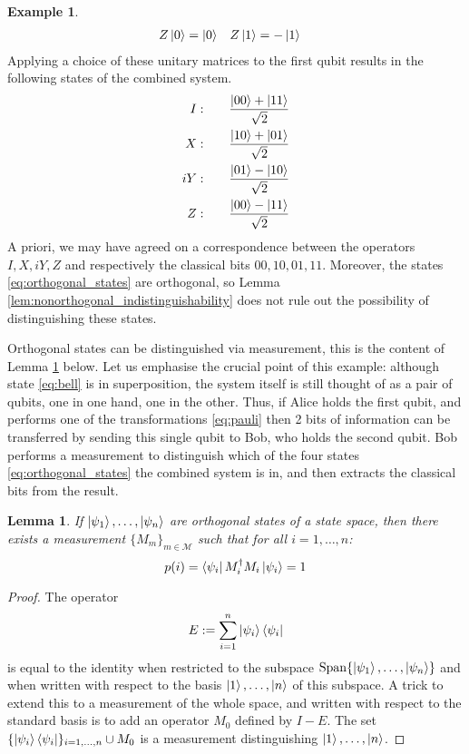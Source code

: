 \documentclass[12pt]{article}
\theoremstyle{plain}
\newtheorem{lemma}[thm]{Lemma}
\theoremstyle{definition}
\newtheorem{example}[thm]{Example}
\newcommand{\call}[1]{\mathcal{#1}}
\begin{document}
\begin{example}
\begin{align*}
			Z\ket{0} &= \ket{0} & Z\ket{1} &=-\ket{1}
		\end{align*}
		Applying a choice of these unitary matrices to the first qubit results in the following states of the combined system.
		\begin{align}\label{eq:orthogonal_states}
			\begin{split}
			I:\qquad & \frac{\ket{00} + \ket{11}}{\sqrt{2}}\\
			X:\qquad & \frac{\ket{10} + \ket{01}}{\sqrt{2}}\\
			iY:\qquad & \frac{\ket{01} - \ket{10}}{\sqrt{2}}\\
			Z:\qquad & \frac{\ket{00} - \ket{11}}{\sqrt{2}}
			\end{split}
		\end{align}
		A priori, we may have agreed on a correspondence between the operators $I,X, iY, Z$ and respectively the classical bits $00, 10, 01, 11$. Moreover, the states \eqref{eq:orthogonal_states} are orthogonal, so Lemma \ref{lem:nonorthogonal_indistinguishability} does not rule out the possibility of distinguishing these states.
		
		Orthogonal states can be distinguished via measurement, this is the content of Lemma \ref{lem:orthogonal_distinguishability} below. Let us emphasise the crucial point of this example: although state \eqref{eq:bell} is in superposition, the system itself is still thought of as a pair of qubits, one in one hand, one in the other. Thus, if Alice holds the first qubit, and performs one of the transformations \eqref{eq:pauli} then 2 bits of information can be transferred by sending this single qubit to Bob, who holds the second qubit. Bob performs a measurement to distinguish which of the four states \eqref{eq:orthogonal_states} the combined system is in, and then extracts the classical bits from the result.
		\end{example}
	\begin{lemma}\label{lem:orthogonal_distinguishability}
		If $\ket{\psi_1},\ldots, \ket{\psi_n}$ are orthogonal states of a state space, then there exists a measurement $\{ M_m \}_{m \in \call{M}}$ such that for all $i = 1,\ldots, n$:
		\begin{equation}
			p(i) = \bra{\psi_i}M_i^\dagger M_i \ket{\psi_i} = 1
			\end{equation}
		\end{lemma}
	\begin{proof}
		The operator
		\begin{equation}
			E := \sum_{i = 1}^n \ket{\psi_i}\bra{\psi_i}
			\end{equation}
		is equal to the identity when restricted to the subspace $\operatorname{Span}\{ \ket{\psi_1},\ldots, \ket{\psi_n} \}$ and when written with respect to the basis $\ket{1},\ldots, \ket{n}$ of this subspace. A trick to extend this to a measurement of the whole space, and written with respect to the standard basis is to add an operator $M_0$ defined by $I - E$. The set $\{ \ket{\psi_i}\bra{\psi_i} \}_{i = 1,\ldots, n}\cup M_0$ is a measurement distinguishing $\ket{1},\ldots, \ket{n}$.
		\end{proof}
	
\end{document}
